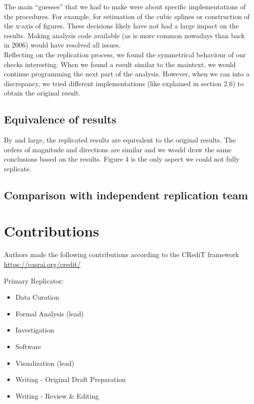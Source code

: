 \documentclass[10,a4paperpaper,]{article}
\begin{document}
The main ``guesses'' that we had to make were about specific
implementations of the procedures. For example, for estimation of the
cubic splines or construction of the x-axis of figures. These decisions
likely have not had a large impact on the results. Making analysis code
available (as is more common nowadays than back in 2006) would have
resolved all issues.\\
Reflecting on the replication process, we found the symmetrical
behaviour of our checks interesting. When we found a result similar to
the maintext, we would continue programming the next part of the
analysis. However, when we ran into a discrepancy, we tried different
implementations (like explained in section 2.6) to obtain the original
result.

\subsection{Equivalence of results}

By and large, the replicated results are equivalent to the original
results. The orders of magnitude and directions are similar and we would
draw the same conclusions based on the results. Figure 4 is the only
aspect we could not fully replicate.

\subsection{Comparison with independent replication team}

\section{Contributions}

Authors made the following contributions according to the CRediT
framework \url{https://casrai.org/credit/}

Primary Replicator:

\begin{itemize}
\tightlist
\item
  Data Curation\\
\item
  Formal Analysis (lead)\\
\item
  Investigation\\
\item
  Software\\
\item
  Visualization (lead)\\
\item
  Writing - Original Draft Preparation\\
\item
  Writing - Review \& Editing
\end{itemize}
\end{document}
